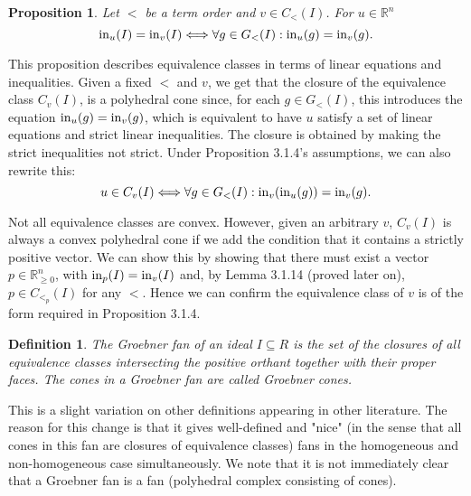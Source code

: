 \documentclass[12pt,a4paper]{report}
\newtheorem{definition}{Definition}
\newtheorem{proposition}{Proposition}
\begin{document}
\begin{proposition}
Let $<$ be a term order and $v \in C_{<} (I)$. For $u \in \mathbb{R}^{n}$
\begin{equation*}
  \operatorname{in}_{u}(I) = \operatorname{in}_{v}(I) \Longleftrightarrow \forall g \in G_{<} (I): \operatorname{in}_{u}(g) = \operatorname{in}_{v}(g).
\end{equation*}
\end{proposition}

This proposition describes equivalence classes in terms of linear equations and inequalities. Given a fixed $<$ and $v$, we get that the closure of the equivalence class $C_{v}(I)$, is a polyhedral cone since, for each $g \in G_{<}(I)$, this introduces the equation $\operatorname{in}_{u}(g) = \operatorname{in}_{v}(g)$, which is equivalent to have $u$ satisfy a set of linear equations and strict linear inequalities. The closure is obtained by making the strict inequalities not strict. Under Proposition 3.1.4's assumptions, we can also rewrite this:
\begin{equation*}
    u \in C_{v}(I) \Longleftrightarrow \forall g \in G_{<}(I): \operatorname{in}_{v}(\operatorname{in}_{u}(g)) = \operatorname{in}_{v}(g).
\end{equation*}

Not all equivalence classes are convex. However, given an arbitrary $v$, $C_{v} (I)$ is always a convex polyhedral cone if we add the condition that it contains a strictly positive vector. We can show this by showing that there must exist a vector $p \in \mathbb R^{n} _{\geq 0}$, with $\operatorname{in}_{p} (I) = \operatorname{in}_{v} (I)$ and, by Lemma 3.1.14 (proved later on), $p \in C_{{<}_{p}} (I)$ for any $<$. Hence we can confirm the equivalence class of $v$ is of the form required in Proposition 3.1.4.


\begin{definition}
The \emph{Groebner fan} of an ideal $I \subseteq R$ is the set of the closures of all equivalence classes intersecting the positive orthant together with their proper faces. The cones in a Groebner fan are called Groebner cones.  
\end{definition}

This is a slight variation on other definitions appearing in other literature. The reason for this change is that it gives well-defined and "nice" (in the sense that all cones in this fan are closures of equivalence classes) fans in the homogeneous and non-homogeneous case simultaneously. We note that it is not immediately clear that a Groebner fan is a fan (polyhedral complex consisting of cones). 
\end{document}
